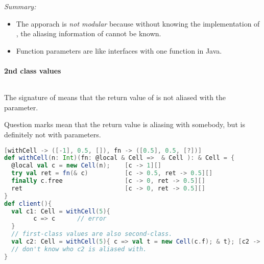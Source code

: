 
\emph{Summary:} 
\begin{itemize}
\item The apporach is \emph{not modular} because without knowing the implementation of , the aliasing information of  cannot be known.
\item Function parameters are like interfaces with one function in Java.
\end{itemize}


\paragraph{2nd class values} 


\[
\]

The signature of  means that the return value of  is not aliased with the parameter. 

Question marks mean that the return value is aliasing with somebody, but is definitely not with parameters.
\begin{lstlisting}[language=Scala,basicstyle=\footnotesize\ttfamily]
[withCell -> ([-1], 0.5, []), fn -> ([0.5], 0.5, [?])]
def withCell(n: Int)(fn: @local & Cell =>  & Cell ): & Cell = {
  @local val c = new Cell(n);    [c -> 1][]
  try val ret = fn(& c)          [c -> 0.5, ret -> 0.5][]  
  finally c.free                 [c -> 0, ret -> 0.5][]  
  ret                            [c -> 0, ret -> 0.5][]     
}
def client(){
  val c1: Cell = withCell(5){ 
        c => c      // error
  }
  // first-class values are also second-class.
  val c2: Cell = withCell(5){ c => val t = new Cell(c.f); & t}; [c2 -> 0.5][]
  // don't know who c2 is aliased with.
}
\end{lstlisting}



